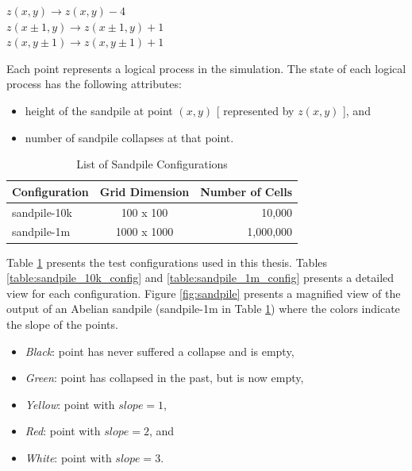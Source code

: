 \documentclass[11pt]{book}
\begin{document}
\begin{center}
  $z(x,y) \to z(x,y) - 4$\\
  $z(x\pm1,y) \to z(x\pm1,y) + 1$\\
  $z(x,y\pm1) \to z(x,y\pm1) + 1$\\
\end{center}

\noindent
Each point represents a logical process in the simulation. The state of each logical process has the following
attributes:

\begin{itemize}
\item height of the sandpile at point $(x,y)$ [ represented by $z(x,y)$ ], and
\item number of sandpile collapses at that point.
\end{itemize}

\begin{table}
    \centering
    \begin{tabular}{| l | c | r |}
        \hline
        \textbf{Configuration} & \textbf{Grid Dimension} & \textbf{Number of Cells}\\
        \hline
        sandpile-10k    & 100 x 100     & 10,000\\
        sandpile-1m     & 1000 x 1000   & 1,000,000\\
        \hline
    \end{tabular}
    \caption{List of Sandpile Configurations}\label{table:sandpile_configs}
\end{table}

\noindent
Table \ref{table:sandpile_configs} presents the test configurations used in this thesis. Tables
\ref{table:sandpile_10k_config} and \ref{table:sandpile_1m_config} presents a detailed view for each configuration.
Figure \ref{fig:sandpile} presents a magnified view of the output of an Abelian sandpile (sandpile-1m in Table
\ref{table:sandpile_configs}) where the colors indicate the slope of the points.

\begin{itemize}
\item \emph{Black}: point has never suffered a collapse and is empty,
\item \emph{Green}: point has collapsed in the past, but is now empty,
\item \emph{Yellow}: point with $slope = 1$,
\item \emph{Red}: point with $slope = 2$, and 
\item \emph{White}: point with $slope = 3$.
\end{itemize}
\end{document}
